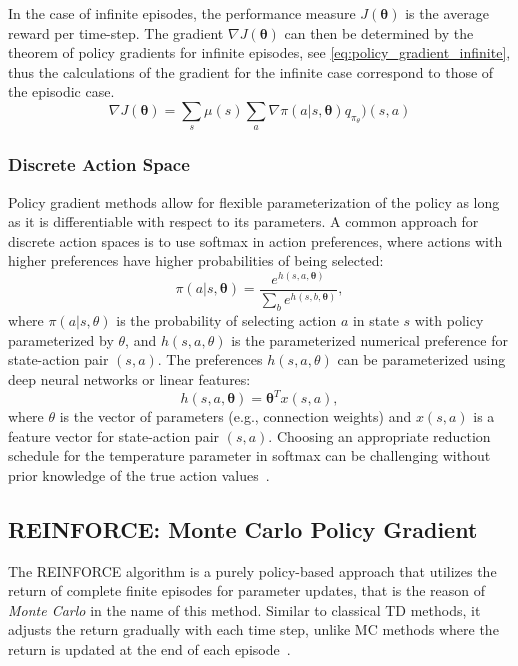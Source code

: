 \documentclass[../xlapes02]{subfiles}
\begin{document}
    In the case of infinite episodes, the performance measure $J(\bm{\theta})$ is the average reward per time-step. The gradient $\nabla J(\bm{\theta})$ can then be determined by the theorem of policy gradients for infinite episodes, see \cref{eq:policy_gradient_infinite}, thus the calculations of the gradient for the infinite case correspond to those of the episodic case.
    \begin{equation}
        \label{eq:policy_gradient_infinite}
        \nabla J(\bm{\theta})=\sum_s\mu(s)\sum_a\nabla\pi(a|s,\bm{\theta})q_{\pi_\theta})(s,a)
    \end{equation}

    \subsubsection{Discrete Action Space}
    Policy gradient methods allow for flexible parameterization of the policy as long as it is differentiable with respect to its parameters. A common approach for discrete action spaces is to use softmax in action preferences, where actions with higher preferences have higher probabilities of being selected:
    \begin{equation}
        \label{eq:softmax}
        \pi(a|s, \bm{\theta}) = \frac{e^{h(s,a,\bm{\theta})}}{\sum_b e^{h(s,b,\bm{\theta})}} ,
    \end{equation}
    where $\pi(a|s, \theta)$ is the probability of selecting action $a$ in state $s$ with policy parameterized by $\theta$, and $h(s,a,\theta)$ is the parameterized numerical preference for state-action pair $(s,a)$. The preferences $h(s,a,\theta)$ can be parameterized using deep neural networks or linear features:
    \begin{equation}
        \label{eq:softmax_linear}
        h(s,a,\bm{\theta}) = \bm{\theta}^T x(s,a) ,
    \end{equation}
    where $\theta$ is the vector of parameters (e.g., connection weights) and $x(s,a)$ is a feature vector for state-action pair $(s,a)$. Choosing an appropriate reduction schedule for the temperature parameter in softmax can be challenging without prior knowledge of the true action values~\cite{sutton2018reinforcement}.

    \subsection{REINFORCE: Monte Carlo Policy Gradient}\label{subsec:monte-carlo-policy-gradient-methods}
    The REINFORCE algorithm is a purely policy-based approach that utilizes the return of complete finite episodes for parameter updates, that is the reason of \emph{Monte Carlo} in the name of this method. Similar to classical TD methods, it adjusts the return gradually with each time step, unlike MC methods where the return is updated at the end of each episode~\cite{rl-course-david-silver, sutton2018reinforcement}.
\end{document}
